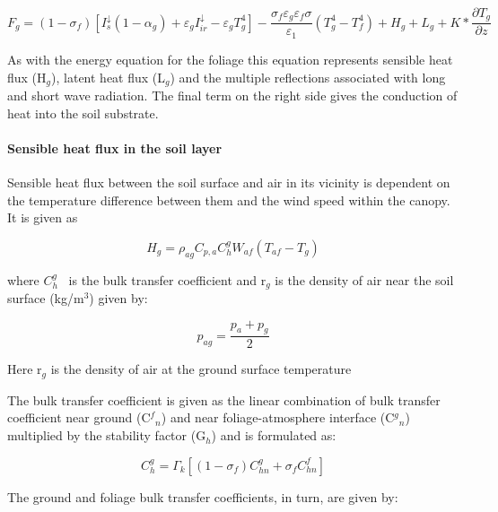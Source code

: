 \begin{equation}
{F_g} = (1 - {\sigma_f})\left[ {I_s^ \downarrow (1 - {\alpha_g}) + {\varepsilon_g}I_{ir}^ \downarrow  - {\varepsilon_g}T_g^4} \right] - \frac{{{\sigma_f}{\varepsilon_g}{\varepsilon_f}\sigma }}{{{\varepsilon_1}}}\left( {T_g^4 - T_f^4} \right) + {H_g} + {L_g} + K*\frac{{\partial {T_g}}}{{\partial z}}
\end{equation}

As with the energy equation for the foliage this equation represents sensible heat flux (H\(_{g}\)), latent heat flux (L\(_{g}\)) and the multiple reflections associated with long and short wave radiation. The final term on the right side gives the conduction of heat into the soil substrate.

\paragraph{Sensible heat flux in the soil layer}\label{sensible-heat-flux-in-the-soil-layer}

Sensible heat flux between the soil surface and air in its vicinity is dependent on the temperature difference between them and the wind speed within the canopy. It is given as

\begin{equation}
{H_g} = {\rho_{ag}}{C_{p,a}}C_h^g{W_{af}}({T_{af}} - {T_g})
\end{equation}

where \(C_h^g\) ~is the bulk transfer coefficient and r\(_{g}\) is the density of air near the soil surface (kg/m\(^{3}\)) given by:

\begin{equation}
{p_{ag}} = \frac{{{p_a} + {p_g}}}{2}
\end{equation}

Here r\(_{g}\) is the density of air at the ground surface temperature

The bulk transfer coefficient is given as the linear combination of bulk transfer coefficient near ground (C\(^{f}\)\(_{n}\)) and near foliage-atmosphere interface (C\(^{g}\)\(_{n}\)) multiplied by the stability factor (G\(_{h}\)) and is formulated as:

\begin{equation}
C_h^g = {\Gamma_k}\left[ {\left( {1 - {\sigma_f}} \right)C_{hn}^g + {\sigma_f}C_{hn}^f} \right]
\end{equation}

The ground and foliage bulk transfer coefficients, in turn, are given by:

